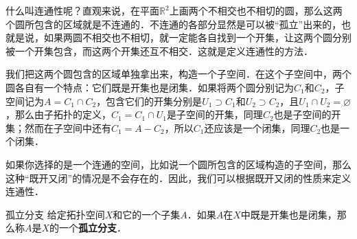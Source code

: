 什么叫连通性呢？直观来说，在平面$\mathbb{R}^2$上画两个不相交也不相切的圆，那么这两个圆所包含的区域就是不连通的．不连通的各部分显然是可以被“孤立”出来的，也就是说，如果两圆不相交也不相切，就一定能各自找到一个开集，让这两个圆分别被一个开集包含，而这两个开集还互不相交．这就是定义连通性的方法．

我们把这两个圆包含的区域单独拿出来，构造一个子空间．在这个子空间中，两个圆各自有一个特点：它们既是开集也是闭集．如果将两个圆分别记为$C_1$和$C_2$，子空间记为$A=C_1\cap C_2$，包含它们的开集分别是$U_1\supset C_1$和$U_2\supset C_2$，且$U_1\cap U_2=\varnothing$，那么由子拓扑的定义，$C_1=C_1\cap U_1$是子空间的开集，同理$C_2$也是子空间的开集；然而在子空间中还有$C_1=A-C_2$，所以$C_1$还应该是一个闭集，同理$C_2$也是一个闭集．

如果你选择的是一个连通的空间，比如说一个圆所包含的区域构造的子空间，那么这种“既开又闭”的情况是不会存在的．因此，我们可以根据既开又闭的性质来定义连通性．

\begin{definition}{孤立分支}
给定拓扑空间$X$和它的一个子集$A$．如果$A$在$X$中既是开集也是闭集，那么称$A$是$X$的一个\textbf{孤立分支}．
\end{definition}